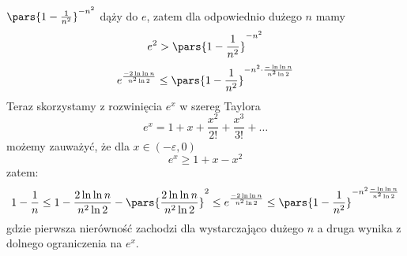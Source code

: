 \( \pars{1 - \frac{1}{n^2}}^{-n^2} \) dąży do \( e \), zatem dla odpowiednio dużego \(n\) mamy
\[
	e^2 > \pars{1 - \frac{1}{n^2}}^{-n^2}
\]
\[
	e^{\frac{-2 \ln \ln n}{n^2 \ln 2}} \leq \pars{1 - \frac{1}{n^2}}^{-n^2 \cdot \frac{-\ln \ln n}{n^2 \ln 2}}
\]
Teraz skorzystamy z rozwinięcia \( e^x \) w szereg Taylora
\[
	e^x = 1 + x + \frac{x^2}{2!} + \frac{x^3}{3!} + \ldots
\]
możemy zauważyć, że dla \( x \in (-\varepsilon, 0) \)
\[
	e^x \geq 1 + x - x^2
\]
zatem:
\[
	1 - \frac{1}{n} \leq 1 - \frac{2 \ln \ln n}{n^2 \ln 2} - \pars{\frac{2 \ln \ln n}{n^2 \ln 2}}^2 \leq e^{\frac{-2 \ln \ln n}{n^2 \ln 2}} \leq \pars{1 - \frac{1}{n^2}}^{-n^2 \frac{- \ln \ln n}{n^2 \ln 2}}
\]
gdzie pierwsza nierówność zachodzi dla wystarczająco dużego \( n \) a druga wynika z dolnego ograniczenia na \( e^x \).
